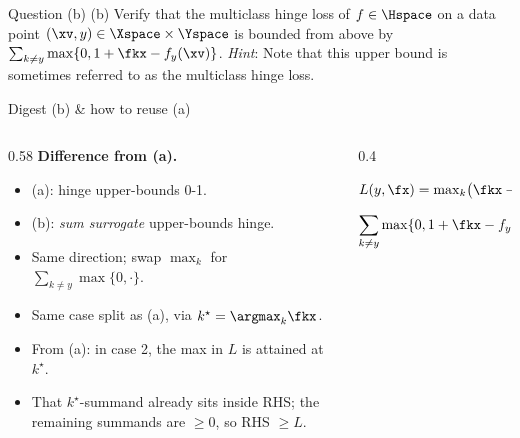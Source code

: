 \documentclass[aspectratio=169]{beamer}
\newcommand{\fyx}{f_y(\xv)}
\begin{document}
\begin{frame}{Question (b)}
	(b) Verify that the multiclass hinge loss of $f \in \Hspace$ on a data point $(\xv, y) \in \Xspace \times \Yspace$ is bounded from above by $\sum_{k\neq y} \max \{0, 1 + \fkx - f_y(\xv) \}$.
	\vspace{10pt}
	\emph{Hint}: Note that this upper bound is sometimes referred to as the multiclass hinge loss.
\end{frame}

\begin{frame}{Digest (b) \& how to reuse (a)}
	\small
	\begin{columns}[T]
	\begin{column}{0.58\textwidth}
		\textbf{Difference from (a).}
		\begin{itemize}
			\item<1-> (a): hinge upper-bounds 0-1.
			\item<2-> (b): \emph{sum surrogate} upper-bounds hinge.
			\item<3-> Same direction; swap $\max_k$ for $\sum_{k\neq y}\max\{0,\cdot\}$.
		\end{itemize}

		\vspace{8pt}
		\begin{itemize}
			\item<4-> Same case split as (a), via $k^\star = \argmax_k \fkx$.
			\item<5-> From (a): in case 2, the max in $L$ is attained at $k^\star$.
			\item<6-> That $k^\star$-summand already sits inside RHS; the remaining summands are $\geq 0$, so RHS $\geq L$.
		\end{itemize}
	\end{column}
	\begin{column}{0.4\textwidth}
		\footnotesize
		\begin{tcolorbox}[
			colback=orange!10, colframe=orange!70!red,
			boxrule=0.5pt, arc=2pt,
			left=4pt, right=4pt, top=2pt, bottom=2pt,
			title=Multiclass hinge, fonttitle=\footnotesize\bfseries,
			boxsep=2pt
		]
			$L(y, \fx) = \max_k\!\big(\fkx - \fyx + \id_{y \neq k}\big)$
		\end{tcolorbox}

		\vspace{4pt}
		\begin{tcolorbox}[
			colback=green!10, colframe=green!45!black,
			boxrule=0.5pt, arc=2pt,
			left=4pt, right=4pt, top=2pt, bottom=2pt,
			title=Sum surrogate, fonttitle=\footnotesize\bfseries,
			boxsep=2pt
		]
			$\displaystyle\sum_{k\neq y}\max\{0, 1 + \fkx - \fyx\}$
		\end{tcolorbox}


\end{column}
\end{columns}
\end{frame}
\end{document}
